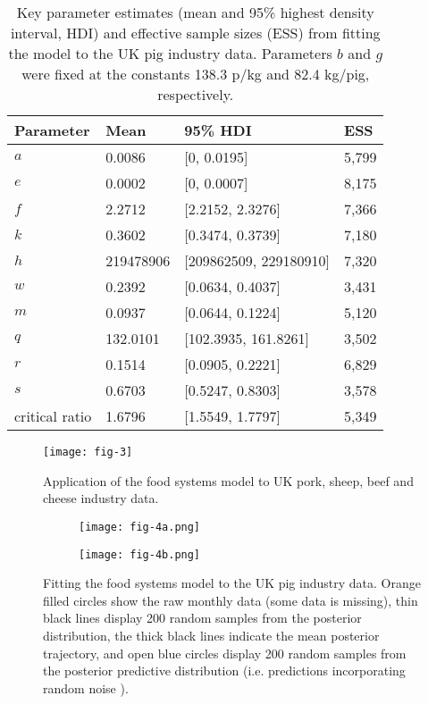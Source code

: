 \documentclass[12pt]{article}
\begin{document}
\begin{table}[t!]
  \centering
  \footnotesize
  \begin{tabular}{p{5cm}p{3cm}p{5cm}p{2cm}}
    \textbf{Parameter} & \textbf{Mean} & \textbf{95\% HDI} & \textbf{ESS} \\ \hline
    $a$ & 0.0086 & [0, 0.0195] & 5,799 \\
    $e$ & 0.0002 & [0, 0.0007] & 8,175 \\
    $f$ & 2.2712 & [2.2152, 2.3276] & 7,366 \\
    $k$ & 0.3602 & [0.3474, 0.3739] & 7,180 \\
    $h$ & 219478906 & [209862509, 229180910] & 7,320 \\
    $w$ & 0.2392 & [0.0634, 0.4037] & 3,431 \\
    $m$ & 0.0937 & [0.0644, 0.1224] & 5,120 \\
    $q$ & 132.0101 & [102.3935, 161.8261] & 3,502 \\
    $r$ & 0.1514 & [0.0905, 0.2221] & 6,829 \\
    $s$ & 0.6703 & [0.5247, 0.8303] & 3,578 \\
    critical ratio & 1.6796 & [1.5549, 1.7797] & 5,349 \\
  \end{tabular}
  \caption{Key parameter estimates (mean and 95\% highest density interval, HDI) and effective sample sizes (ESS) from fitting the model to the UK pig industry data. Parameters $b$ and $g$ were fixed at the constants 138.3 p/kg and 82.4 kg/pig, respectively.}
  \label{table_parameter_estimates}
\end{table}

\begin{figure}[t]
    \texttt{[image: fig-3]}
    \caption{Application of the food systems model to UK pork, sheep, beef and cheese industry data.}
\end{figure}

\begin{figure}[t!]

  \begin{subfigure}{\textwidth}
      \caption{}
      \texttt{[image: fig-4a.png]}%
  \end{subfigure}%

  \begin{subfigure}{\textwidth}
      \caption{}
      \texttt{[image: fig-4b.png]}%
  \end{subfigure}%

  \caption{Fitting the food systems model to the UK pig industry data. Orange filled circles show the raw monthly data (some data is missing), thin black lines display 200 random samples from the posterior distribution, the thick black lines indicate the mean posterior trajectory, and open blue circles display 200 random samples from the posterior predictive distribution (i.e. predictions incorporating random noise ).}
  \label{fig_posterior_predictions}
\end{figure}
\end{document}
